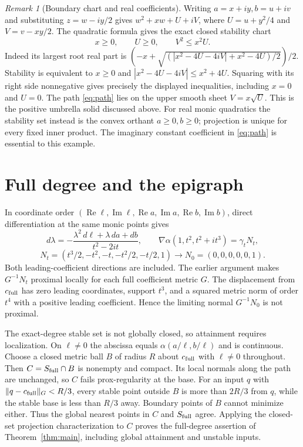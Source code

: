 \documentclass[11pt]{article}
\theoremstyle{remark}\newtheorem{remark}[theorem]{Remark}
\newcommand{\norm}[1]{\lVert #1\rVert}
\newcommand{\Rea}{\operatorname{Re}}
\newcommand{\Ima}{\operatorname{Im}}
\begin{document}
\begin{remark}[Boundary chart and real coefficients]\label{rem:chart}
Writing $a=x+iy,b=u+iv$ and substituting $z=w-iy/2$ gives
$w^2+xw+U+iV$, where $U=u+y^2/4$ and $V=v-xy/2$.
The quadratic formula gives the exact closed stability chart
\[
 x\geq0,\qquad U\geq0,\qquad V^2\leq x^2U.
\]
Indeed its largest root real part is
$(-x+\sqrt{(|x^2-4U-4iV|+x^2-4U)/2})/2$.
Stability is equivalent to $x\geq0$ and
$|x^2-4U-4iV|\leq x^2+4U$. Squaring with its right side nonnegative gives
precisely the displayed inequalities, including $x=0$ and $U=0$.
The path \eqref{eq:path} lies on the upper smooth
sheet $V=x\sqrt U$. This is the positive umbrella solid discussed above.
For real monic quadratics the stability set instead is the convex orthant
$a\geq0,b\geq0$; projection is unique for every fixed inner product. The
imaginary constant coefficient in \eqref{eq:path} is essential to this example.
\end{remark}

\section{Full degree and the epigraph}
In coordinate order
$(\Rea\ell,\Ima\ell,\Rea a,\Ima a,\Rea b,\Ima b)$,
direct differentiation at the same monic points gives
\[
 d\lambda=-\frac{\lambda^2\,d\ell+\lambda\,da+db}{t^2-2it},\qquad
 \nabla\alpha(1,t^2,t^2+it^3)=\gamma_t N_t,
\]
\[
 N_t=(t^3/2,-t^2,-t,-t^2/2,-t/2,1)
       \longrightarrow N_0=(0,0,0,0,0,1).
\]
Both leading-coefficient directions are included. The earlier argument makes
$G^{-1}N_t$ proximal locally for each full coefficient metric $G$.
The displacement from $c_{\rm full}$ has
zero leading coordinates, support $t^3$, and a squared metric norm of order
$t^4$ with a positive leading coefficient. Hence the limiting normal
$G^{-1}N_0$ is not proximal.

The exact-degree stable set is not globally closed, so attainment requires
localization. On $\ell\ne0$ the abscissa equals $\alpha(a/\ell,b/\ell)$ and
is continuous. Choose a closed metric ball $B$ of radius $R$ about
$c_{\rm full}$ with $\ell\ne0$ throughout. Then
$C=S_{\rm full}\cap B$ is nonempty and compact. Its local normals along
the path are unchanged, so $C$ fails prox-regularity at the base. For an
input $q$ with $\norm{q-c_{\rm full}}_G<R/3$, every stable point outside
$B$ is more than $2R/3$ from $q$, while the stable base is less than $R/3$
away. Boundary points of $B$ cannot minimize either. Thus the global nearest
points in $C$ and $S_{\rm full}$ agree. Applying the closed-set projection
characterization to $C$ proves the full-degree assertion of
Theorem~\ref{thm:main}, including global attainment and unstable inputs.
\end{document}
